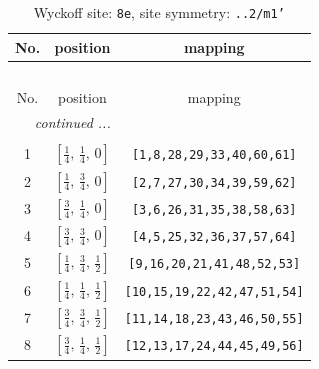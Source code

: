 \documentclass[fleqn,8pt]{jsarticle}
\begin{document}
\begin{longtable}{ccc}
\caption{Wyckoff site: {\tt 8e}, site symmetry: {\tt ..2/m1'}}
 \\
 \hline \hline
No. & position & mapping \\ \hline \endfirsthead

\multicolumn{2}{l}{\tablename\ \thetable{}} \\
 \hline \hline
No. & position & mapping \\ \hline \endhead

 \hline \hline
\multicolumn{2}{r}{\footnotesize\it continued ...} \\ \endfoot

 \hline \hline
\multicolumn{2}{r}{} \\ \endlastfoot

1 & $\left[ \frac{1}{4},\, \frac{1}{4},\, 0 \right]$ & {\tt [1,8,28,29,33,40,60,61]} \\ \hline
2 & $\left[ \frac{1}{4},\, \frac{3}{4},\, 0 \right]$ & {\tt [2,7,27,30,34,39,59,62]} \\ \hline
3 & $\left[ \frac{3}{4},\, \frac{1}{4},\, 0 \right]$ & {\tt [3,6,26,31,35,38,58,63]} \\ \hline
4 & $\left[ \frac{3}{4},\, \frac{3}{4},\, 0 \right]$ & {\tt [4,5,25,32,36,37,57,64]} \\ \hline
5 & $\left[ \frac{1}{4},\, \frac{3}{4},\, \frac{1}{2} \right]$ & {\tt [9,16,20,21,41,48,52,53]} \\ \hline
6 & $\left[ \frac{1}{4},\, \frac{1}{4},\, \frac{1}{2} \right]$ & {\tt [10,15,19,22,42,47,51,54]} \\ \hline
7 & $\left[ \frac{3}{4},\, \frac{3}{4},\, \frac{1}{2} \right]$ & {\tt [11,14,18,23,43,46,50,55]} \\ \hline
8 & $\left[ \frac{3}{4},\, \frac{1}{4},\, \frac{1}{2} \right]$ & {\tt [12,13,17,24,44,45,49,56]} \\
\end{longtable}
\renewcommand{\arraystretch}{1.2}
\end{document}
